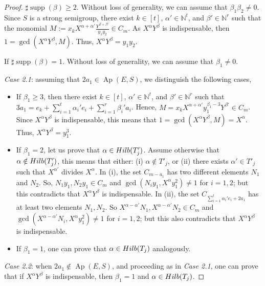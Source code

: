 \documentclass[10pt,a4paper]{amsart}
\def\Ap{\operatorname{Ap}}
\def\N{\mathbb{N}}
\def\supp{\operatorname{supp}}
\begin{document}
\begin{proof}
 $\sharp \supp (\beta)\ge 2$. Without loss of generality, we can assume that $\beta_1\beta_2\neq 0$. Since $S$ is a strong semigroup, there exist $k\in [t]$, $\alpha'\in \N^t$, and $\beta'\in \N^r$ such that the monomial $M := x_kX^{\alpha+ \alpha'}\frac{Y^{\beta + \beta'}}{y_1y_2} \in C_m$. As $X^\alpha Y^\beta$ is indispensable, then $1 = \gcd(X^\alpha Y^\beta, M).$ Thus, $X^\alpha Y^\beta = y_1 y_2$.

 If $\sharp \supp (\beta) = 1$. Without loss of generality, we can assume that $\beta_1 \neq 0.$

{\em Case 2.1}: assuming that $2a_1 \in \Ap(E,S)$, we distinguish the following cases,

\begin{itemize}
\item If $\beta_1 \geq 3$, then  there exist $k\in [t]$, $\alpha'\in \N^t$, and $\beta'\in \N^r$ such that $3 a_1 = e_k + \sum_{i = 1}^t \alpha_i' e_i + \sum_{i = 1}^r \beta_i' a_i$. Hence, $M = x_k X^{\alpha + \alpha'} y_1^{\beta_1 - 3} Y^{\beta'}\in C_m$. Since $X^\alpha Y^{\beta}$ is indispensable, this means that $1 = \gcd(X^\alpha Y^\beta, M) = X^{\alpha}.$ Thus, $X^\alpha Y^\beta = y_1^3$.

\item  If $\beta_1 = 2$, let us prove that $\alpha \in {\rm Hilb} (T'_j)$. Assume otherwise that $\alpha \notin {\rm Hilb} (T'_j)$, this means that either: (i) $\alpha \notin T'_j$, or (ii) there exists $\alpha' \in T'_j$ such that $X^{\alpha'}$ divides $X^{\alpha}$. In (i), the set $C_{m-a_1}$ has two different elements $N_1$ and $N_2$. So, $N_1 y_1, N_2 y_1 \in C_{m}$ and $\gcd(N_iy_1,X^\alpha y_1^2) \neq 1$ for $i = 1,2$; but this contradicts that $X^{\alpha} Y^{\beta}$ is indispensable. In (ii), the set $C_{\sum_{i = 1}^t \alpha_i'e_i + 2 a_1}$ has at least two elements $N_1, N_2$. So  $X^{\alpha - \alpha'}N_1, X^{\alpha - \alpha'} N_2 \in C_{m}$ and $\gcd(X^{\alpha - \alpha'} N_i,X^\alpha y_1^2) \neq 1$ for $i = 1,2$; but this also contradicts that $X^{\alpha} Y^{\beta}$ is indispensable.

\item  If $\beta_1 = 1$, one can prove that $\alpha \in {\rm Hilb} (T_j)$ analogously.
\end{itemize}

{\em Case 2.2}: when $2a_1 \notin \Ap(E,S)$, and proceeding as in {\em Case 2.1}, one can prove that if $X^{\alpha}Y^{\beta}$ is indispensable, then $\beta_1 = 1$ and $\alpha \in {\rm Hilb} (T_j)$.
\end{proof}
\end{document}
